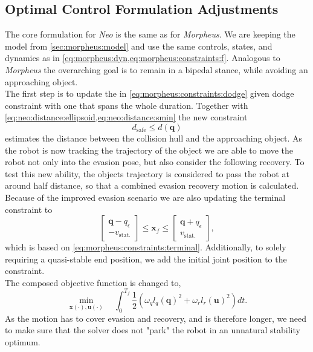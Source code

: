\subsection{Optimal Control Formulation Adjustments}
The core formulation for \textit{Neo} is the same as for \textit{Morpheus}.
We are keeping the model from \cref{sec:morpheus:model} and use the same controls, states, and dynamics as in \cref{eq:morpheus:dyn,eq:morpheus:constraints:f}.
Analogous to \textit{Morpheus} the overarching goal is to remain in a bipedal stance, while avoiding an approaching object.
\\
The first step is to update the in \cref{eq:morpheus:constraints:dodge} given dodge constraint with one that spans the whole duration.
Together with \cref{eq:neo:distance:ellipsoid,eq:neo:distance:smin} the new constraint
\begin{equation}
  d_\text{safe} \leq d(\bm q)
  \label{eq:neo:constraints:dodge}
\end{equation}
estimates the distance between the collision hull and the approaching object.
As the robot is now tracking the trajectory of the object we are able to move the robot not only into the evasion pose, but also consider the following recovery.
To test this new ability, the objects trajectory is considered to pass the robot at around half distance, so that a combined evasion recovery motion is calculated.
Because of the improved evasion scenario we are also updating the terminal constraint to
\begin{equation}
  \begin{bmatrix}
    \bm q - q_\epsilon \\
    - v_\text{stat.}
  \end{bmatrix}
  \leq \bm x_f \leq
  \begin{bmatrix}
    \bm q + q_\epsilon \\
    v_\text{stat.}
  \end{bmatrix},
\end{equation}
which is based on \cref{eq:morpheus:constraints:terminal}.
Additionally, to solely requiring a quasi-stable end position, we add the initial joint position to the constraint.
\\
The composed objective function is changed to,
\begin{equation}
  \min_{\bm x(\cdot),\bm u(\cdot)} \quad
  \int_0^{T_f} \frac 1 2 \left(\omega_q l_q(\bm q)^2 + \omega_r l_r(\bm{u})^2 \right) dt.
\end{equation}
As the motion has to cover evasion and recovery, and is therefore longer, we need to make sure that the solver does not "park" the robot in an unnatural stability optimum.
